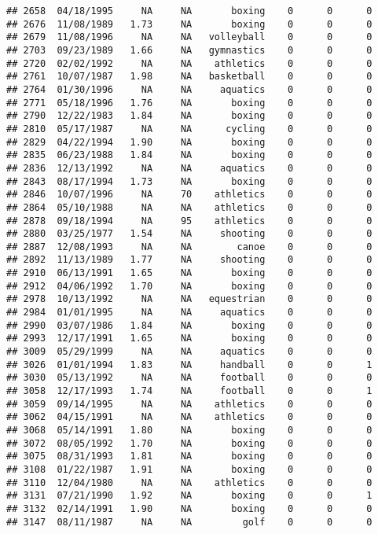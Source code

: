 \documentclass[]{article}
\begin{document}
\begin{verbatim}
## 2658  04/18/1995     NA     NA       boxing    0      0      0
## 2676  11/08/1989   1.73     NA       boxing    0      0      0
## 2679  11/08/1996     NA     NA   volleyball    0      0      0
## 2703  09/23/1989   1.66     NA   gymnastics    0      0      0
## 2720  02/02/1992     NA     NA    athletics    0      0      0
## 2761  10/07/1987   1.98     NA   basketball    0      0      0
## 2764  01/30/1996     NA     NA     aquatics    0      0      0
## 2771  05/18/1996   1.76     NA       boxing    0      0      0
## 2790  12/22/1983   1.84     NA       boxing    0      0      0
## 2810  05/17/1987     NA     NA      cycling    0      0      0
## 2829  04/22/1994   1.90     NA       boxing    0      0      0
## 2835  06/23/1988   1.84     NA       boxing    0      0      0
## 2836  12/13/1992     NA     NA     aquatics    0      0      0
## 2843  08/17/1994   1.73     NA       boxing    0      0      0
## 2846  10/07/1996     NA     70    athletics    0      0      0
## 2864  05/10/1988     NA     NA    athletics    0      0      0
## 2878  09/18/1994     NA     95    athletics    0      0      0
## 2880  03/25/1977   1.54     NA     shooting    0      0      0
## 2887  12/08/1993     NA     NA        canoe    0      0      0
## 2892  11/13/1989   1.77     NA     shooting    0      0      0
## 2910  06/13/1991   1.65     NA       boxing    0      0      0
## 2912  04/06/1992   1.70     NA       boxing    0      0      0
## 2978  10/13/1992     NA     NA   equestrian    0      0      0
## 2984  01/01/1995     NA     NA     aquatics    0      0      0
## 2990  03/07/1986   1.84     NA       boxing    0      0      0
## 2993  12/17/1991   1.65     NA       boxing    0      0      0
## 3009  05/29/1999     NA     NA     aquatics    0      0      0
## 3026  01/01/1994   1.83     NA     handball    0      0      1
## 3030  05/13/1992     NA     NA     football    0      0      0
## 3058  12/17/1993   1.74     NA     football    0      0      1
## 3059  09/14/1995     NA     NA    athletics    0      0      0
## 3062  04/15/1991     NA     NA    athletics    0      0      0
## 3068  05/14/1991   1.80     NA       boxing    0      0      0
## 3072  08/05/1992   1.70     NA       boxing    0      0      0
## 3075  08/31/1993   1.81     NA       boxing    0      0      0
## 3108  01/22/1987   1.91     NA       boxing    0      0      0
## 3110  12/04/1980     NA     NA    athletics    0      0      0
## 3131  07/21/1990   1.92     NA       boxing    0      0      1
## 3132  02/14/1991   1.90     NA       boxing    0      0      0
## 3147  08/11/1987     NA     NA         golf    0      0      0

\end{verbatim}
\end{document}
